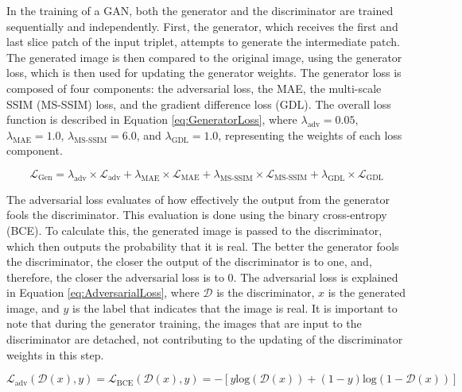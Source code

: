 In the training of a GAN, both the generator and the discriminator are trained sequentially and independently. First, the generator, which receives the first and last slice patch of the input triplet, attempts to generate the intermediate patch. The generated image is then compared to the original image, using the generator loss, which is then used for updating the generator weights. The generator loss is composed of four components: the adversarial loss, the MAE, the multi-scale SSIM (MS-SSIM) loss, and the gradient difference loss (GDL). The overall loss function is described in Equation \ref{eq:GeneratorLoss}, where $\lambda_{\text{adv}}=0.05$, $\lambda_{\text{MAE}}=1.0$, $\lambda_{\text{MS-SSIM}}=6.0$, and $\lambda_{\text{GDL}}=1.0$, representing the weights of each loss component.

\begin{equation}
	\mathcal{L}_{\text{Gen}} = \lambda_{\text{adv}} \times \mathcal{L}_{\text{adv}} + \lambda_{\text{MAE}} \times \mathcal{L}_{\text{MAE}} + \lambda_{\text{MS-SSIM}} \times \mathcal{L}_{\text{MS-SSIM}} + \lambda_{\text{GDL}} \times \mathcal{L}_{\text{GDL}}
	\label{eq:GeneratorLoss}
\end{equation}

The adversarial loss evaluates of how effectively the output from the generator fools the discriminator. This evaluation is done using the binary cross-entropy (BCE). To calculate this, the generated image is passed to the discriminator, which then outputs the probability that it is real. The better the generator fools the discriminator, the closer the output of the discriminator is to one, and, therefore, the closer the adversarial loss is to 0. The adversarial loss is explained in Equation \ref{eq:AdversarialLoss}, where $\mathcal{D}$ is the discriminator, $x$ is the generated image, and $y$ is the label that indicates that the image is real. It is important to note that during the generator training, the images that are input to the discriminator are detached, not contributing to the updating of the discriminator weights in this step.

\begin{equation}
	\mathcal{L}_{\text{adv}} (\mathcal{D}(x), y) = \mathcal{L}_{\text{BCE}} (\mathcal{D}(x), y) = - \left[ y \text{log}(\mathcal{D}(x)) + (1 - y)\text{log}(1 - \mathcal{D}(x)) \right]
	\label{eq:AdversarialLoss}
\end{equation}

